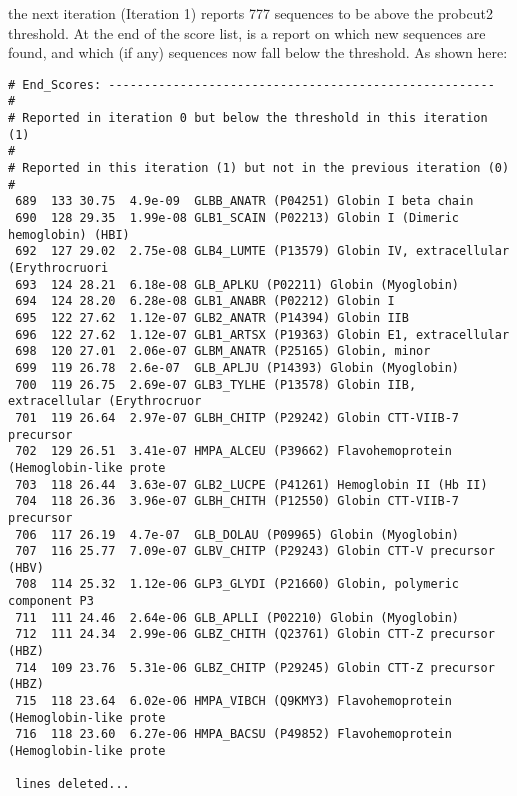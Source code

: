 \documentclass[12pt]{article}
\begin{document}
the next iteration (Iteration 1) reports 777 sequences to be above the
probcut2 threshold.  At the end of the score list, is a report on
which new sequences are found, and which (if any) sequences now fall
below the threshold.  As shown here:

\begin{scriptsize}
\begin{verbatim}
# End_Scores: ------------------------------------------------------
#
# Reported in iteration 0 but below the threshold in this iteration (1)
#
# Reported in this iteration (1) but not in the previous iteration (0)
#
 689  133 30.75  4.9e-09  GLBB_ANATR (P04251) Globin I beta chain                      
 690  128 29.35  1.99e-08 GLB1_SCAIN (P02213) Globin I (Dimeric hemoglobin) (HBI)      
 692  127 29.02  2.75e-08 GLB4_LUMTE (P13579) Globin IV, extracellular (Erythrocruori  
 693  124 28.21  6.18e-08 GLB_APLKU (P02211) Globin (Myoglobin)                       
 694  124 28.20  6.28e-08 GLB1_ANABR (P02212) Globin I                                 
 695  122 27.62  1.12e-07 GLB2_ANATR (P14394) Globin IIB                               
 696  122 27.62  1.12e-07 GLB1_ARTSX (P19363) Globin E1, extracellular                 
 698  120 27.01  2.06e-07 GLBM_ANATR (P25165) Globin, minor                            
 699  119 26.78  2.6e-07  GLB_APLJU (P14393) Globin (Myoglobin)                       
 700  119 26.75  2.69e-07 GLB3_TYLHE (P13578) Globin IIB, extracellular (Erythrocruor  
 701  119 26.64  2.97e-07 GLBH_CHITP (P29242) Globin CTT-VIIB-7 precursor              
 702  129 26.51  3.41e-07 HMPA_ALCEU (P39662) Flavohemoprotein (Hemoglobin-like prote  
 703  118 26.44  3.63e-07 GLB2_LUCPE (P41261) Hemoglobin II (Hb II)                    
 704  118 26.36  3.96e-07 GLBH_CHITH (P12550) Globin CTT-VIIB-7 precursor              
 706  117 26.19  4.7e-07  GLB_DOLAU (P09965) Globin (Myoglobin)                       
 707  116 25.77  7.09e-07 GLBV_CHITP (P29243) Globin CTT-V precursor (HBV)             
 708  114 25.32  1.12e-06 GLP3_GLYDI (P21660) Globin, polymeric component P3           
 711  111 24.46  2.64e-06 GLB_APLLI (P02210) Globin (Myoglobin)                       
 712  111 24.34  2.99e-06 GLBZ_CHITH (Q23761) Globin CTT-Z precursor (HBZ)             
 714  109 23.76  5.31e-06 GLBZ_CHITP (P29245) Globin CTT-Z precursor (HBZ)             
 715  118 23.64  6.02e-06 HMPA_VIBCH (Q9KMY3) Flavohemoprotein (Hemoglobin-like prote  
 716  118 23.60  6.27e-06 HMPA_BACSU (P49852) Flavohemoprotein (Hemoglobin-like prote  

 lines deleted...
\end{verbatim}
\end{scriptsize}
\end{document}
